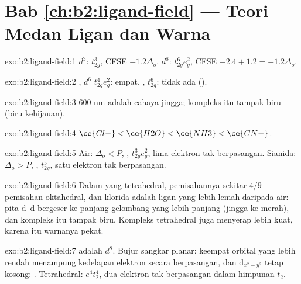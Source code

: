 \section*{Bab \ref{ch:b2:ligand-field} --- Teori Medan Ligan dan Warna}

\begin{solution}{exo:b2:ligand-field:1}
$d^3$: $t_{2g}^3$, CFSE $-1.2\Delta_o$. $d^8$: $t_{2g}^6e_g^2$, CFSE $-2.4 + 1.2 = -1.2\Delta_o$.
\end{solution}

\begin{solution}{exo:b2:ligand-field:2}
, $d^6$  $t_{2g}^4e_g^2$: empat. , 
$t_{2g}^6$: tidak ada ().
\end{solution}

\begin{solution}{exo:b2:ligand-field:3}
600 nm adalah cahaya jingga; kompleks itu tampak biru (biru kehijauan).
\end{solution}

\begin{solution}{exo:b2:ligand-field:4}
$\ce{Cl-} < \ce{H2O} < \ce{NH3} < \ce{CN-}$.
\end{solution}

\begin{solution}{exo:b2:ligand-field:5}
Air: $\Delta_o < P$, , $t_{2g}^3e_g^2$, lima elektron tak berpasangan. Sianida: $\Delta_o > P$,
, $t_{2g}^5$, satu elektron tak berpasangan.
\end{solution}

\begin{solution}{exo:b2:ligand-field:6}
Dalam  yang tetrahedral, pemisahannya sekitar $4/9$ pemisahan
oktahedral, dan klorida adalah ligan yang lebih lemah daripada air: pita
d--d bergeser ke panjang gelombang yang lebih panjang (jingga ke merah), dan
kompleks itu tampak biru. Kompleks tetrahedral juga menyerap lebih kuat,
karena itu warnanya pekat.
\end{solution}

\begin{solution}{exo:b2:ligand-field:7}
 adalah $d^8$. Bujur sangkar planar: keempat orbital yang lebih
rendah menampung kedelapan elektron secara berpasangan, dan
$\mathrm d_{x^2-y^2}$ tetap kosong: . Tetrahedral: $e^4t_2^4$, dua
elektron tak berpasangan dalam himpunan $t_2$.
\end{solution}


